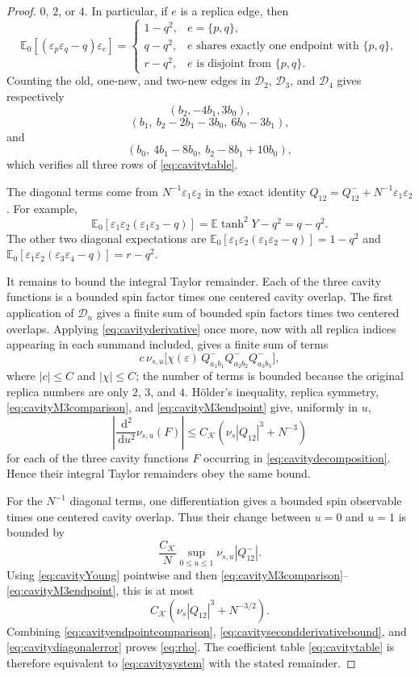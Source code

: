 \documentclass[11pt]{article}
\numberwithin{equation}{section}
\theoremstyle{plain}
\theoremstyle{definition}
\newcommand{\E}{\mathbb E}
\newcommand{\1}{\mathbf 1}
\newcommand{\cK}{\mathcal K}
\newcommand{\dd}{\,\mathrm d}
\begin{document}
\begin{proof}
$0$, $2$, or $4$.  In particular, if $e$ is a replica edge, then
\[
 \E_0[(\varepsilon_p\varepsilon_q-q)\varepsilon_e]
 =
 \begin{cases}
  1-q^2,&e=\{p,q\},\\
  q-q^2,&e\text{ shares exactly one endpoint with }\{p,q\},\\
  r-q^2,&e\text{ is disjoint from }\{p,q\}.
 \end{cases}
\]
Counting the old, one-new, and two-new edges in $\mathcal D_2$,
$\mathcal D_3$, and $\mathcal D_4$ gives respectively
\[
 (b_2,-4b_1,3b_0),
\]
\[
 (b_1,\ b_2-2b_1-3b_0,\ 6b_0-3b_1),
\]
and
\[
 (b_0,\ 4b_1-8b_0,\ b_2-8b_1+10b_0),
\]
which verifies all three rows of \eqref{eq:cavitytable}.

The diagonal terms come from
$N^{-1}\varepsilon_1\varepsilon_2$ in the exact identity
$Q_{12}=Q^-_{12}+N^{-1}\varepsilon_1\varepsilon_2$.  For example,
\[
 \E_0[\varepsilon_1\varepsilon_2
       (\varepsilon_1\varepsilon_3-q)]
 =\E\tanh^2Y-q^2=q-q^2.
\]
The other two diagonal expectations are
$\E_0[\varepsilon_1\varepsilon_2
(\varepsilon_1\varepsilon_2-q)]=1-q^2$ and
$\E_0[\varepsilon_1\varepsilon_2
(\varepsilon_3\varepsilon_4-q)]=r-q^2$.

It remains to bound the integral Taylor remainder.  Each of the three
cavity functions is a bounded spin factor times one centered cavity
overlap.  The first application of $\mathcal D_n$ gives a finite sum
of bounded spin factors times two centered overlaps.  Applying
\eqref{eq:cavityderivative} once more, now with all replica indices
appearing in each summand included, gives a finite sum of terms
\[
 c\,\nu_{s,u}\bigl[
 \chi(\varepsilon)\,Q^-_{a_1b_1}Q^-_{a_2b_2}Q^-_{a_3b_3}\bigr],
\]
where $|c|\le C$ and $|\chi|\le C$; the number of terms is bounded
because the original replica numbers are only $2$, $3$, and $4$.
H\"older's inequality,
replica symmetry, \eqref{eq:cavityM3comparison}, and
\eqref{eq:cavityM3endpoint} give, uniformly in $u$,
\begin{equation}
 \left|\frac{\dd^2}{\dd u^2}\nu_{s,u}(F)\right|
 \le C_{\cK}\left(\nu_s|Q_{12}|^3+N^{-3}\right)
 \label{eq:cavitysecondderivativebound}
\end{equation}
for each of the three cavity functions $F$ occurring in
\eqref{eq:cavitydecomposition}.  Hence their integral Taylor remainders obey
the same bound.

For the $N^{-1}$ diagonal terms, one differentiation gives a bounded
spin observable times one centered cavity overlap.  Thus their change
between $u=0$ and $u=1$ is bounded by
\[
 \frac{C_{\cK}}N\sup_{0\le u\le1}\nu_{s,u}|Q^-_{12}|.
\]
Using \eqref{eq:cavityYoung} pointwise and then
\eqref{eq:cavityM3comparison}--\eqref{eq:cavityM3endpoint}, this is at
most
\begin{equation}
 C_{\cK}\left(\nu_s|Q_{12}|^3+N^{-3/2}\right).
 \label{eq:cavitydiagonalerror}
\end{equation}
Combining \eqref{eq:cavityendpointcomparison},
\eqref{eq:cavitysecondderivativebound}, and
\eqref{eq:cavitydiagonalerror} proves \eqref{eq:rho}.  The coefficient
table \eqref{eq:cavitytable} is therefore equivalent to
\eqref{eq:cavitysystem} with the stated remainder.
\end{proof}
\end{document}

